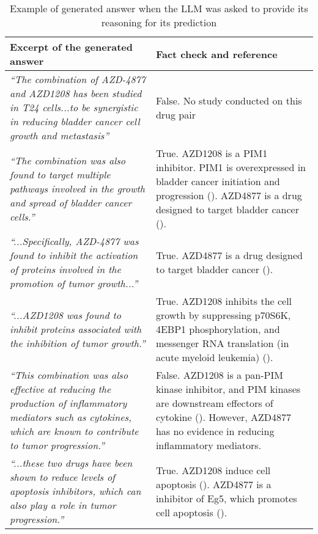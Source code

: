 {\begin{table}[!htp]
\begin{tabular}{|p{3in}|p{3in}|}\toprule
Excerpt of the generated answer & Fact check and reference \\ \hline
\emph{``The combination of AZD-4877 and AZD1208 has been studied in T24 cells...to be synergistic in reducing bladder cancer cell growth and metastasis''} &False. No study conducted on this drug pair \\ \hline
\emph{``The combination was also found to target multiple pathways involved in the growth and spread of bladder cancer cells.''} &True. AZD1208 is a PIM1 inhibitor. PIM1 is overexpressed in bladder cancer initiation and progression (\cite{Guo2010-ly}). AZD4877 is a drug designed to target bladder cancer (\cite{Jones2013-zl}). \\ \hline
\emph{``...Specifically, AZD-4877 was found to inhibit the activation of proteins involved in the promotion of tumor growth...''} &True. AZD4877 is a drug designed to target bladder cancer (\cite{Jones2013-zl}). \\ \hline
\emph{``...AZD1208 was found to inhibit proteins associated with the inhibition of tumor growth.''} &True. AZD1208 inhibits the cell growth by suppressing p70S6K, 4EBP1 phosphorylation, and messenger RNA translation (in acute myeloid leukemia) (\cite{Cortes2018-tx}). \\ \hline
\emph{``This combination was also effective at reducing the production of inflammatory mediators such as cytokines, which are known to contribute to tumor progression.''} &False. AZD1208 is a pan-PIM kinase inhibitor, and PIM kinases are downstream effectors of cytokine (\cite{noauthor_2011-op}). However, AZD4877 has no evidence in reducing inflammatory mediators. \\ \hline
\emph{``...these two drugs have been shown to reduce levels of apoptosis inhibitors, which can also play a role in tumor progression.''} &True. AZD1208 induce cell apoptosis (\cite{Cervantes-Gomez2019-de}). AZD4877 is a inhibitor of Eg5, which promotes cell apoptosis (\cite{Borthakur2009-wg}). \\
\bottomrule
\end{tabular}
\caption{Example of generated answer when the LLM was asked to provide its reasoning for its prediction}\label{tab:reasoning}
\end{table}
}
